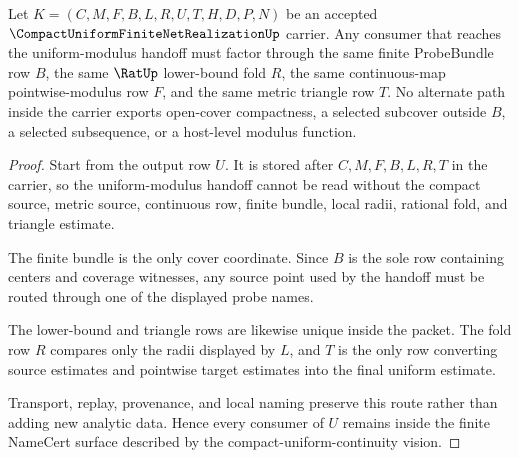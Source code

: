 \begin{theorem}
\label{thm:compact-uniform-finite-net-realization-nonescape}
Let $K=(C,M,F,B,L,R,U,T,H,D,P,N)$ be an accepted $\CompactUniformFiniteNetRealizationUp$ carrier. Any consumer that reaches the uniform-modulus handoff must factor through the same finite ProbeBundle row $B$, the same $\RatUp$ lower-bound fold $R$, the same continuous-map pointwise-modulus row $F$, and the same metric triangle row $T$. No alternate path inside the carrier exports open-cover compactness, a selected subcover outside $B$, a selected subsequence, or a host-level modulus function.
\end{theorem}
\begin{proof}
Start from the output row $U$. It is stored after $C,M,F,B,L,R,T$ in the carrier, so the uniform-modulus handoff cannot be read without the compact source, metric source, continuous row, finite bundle, local radii, rational fold, and triangle estimate.

The finite bundle is the only cover coordinate. Since $B$ is the sole row containing centers and coverage witnesses, any source point used by the handoff must be routed through one of the displayed probe names.

The lower-bound and triangle rows are likewise unique inside the packet. The fold row $R$ compares only the radii displayed by $L$, and $T$ is the only row converting source estimates and pointwise target estimates into the final uniform estimate.

Transport, replay, provenance, and local naming preserve this route rather than adding new analytic data. Hence every consumer of $U$ remains inside the finite NameCert surface described by the compact-uniform-continuity vision.
\end{proof}



